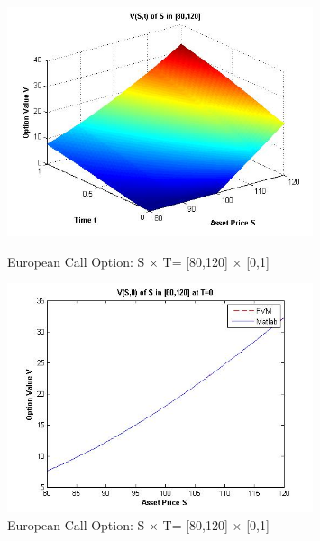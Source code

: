\documentclass[final]{siamltex}
\begin{document}
\begin{figure}[H]
	\centering
	
	\includegraphics[width=0.8\textwidth]{European_call_main}
	\caption{European Call Option: S $\times $ T= [80,120] $\times $ [0,1]}
	
	\includegraphics[width=0.8\textwidth]{European_call_Final20}
	\caption{European Call Option: S $\times $ T= [80,120] $\times $ [0,1]}
	\label{European_call_main}	
\end{figure}
\end{document}

